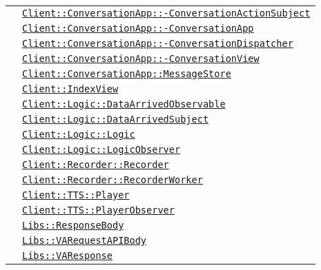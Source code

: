 \begin{longtable}{|>{\centering}m{3cm}|m{10cm}<{\centering}|}
& \hyperref[Client::ConversationApp::ConversationActionSubject]{\texttt{Client::ConversationApp::-\linebreak ConversationActionSubject}}\\
& \hyperref[Client::ConversationApp::ConversationApp]{\texttt{Client::ConversationApp::-\linebreak ConversationApp}}\\
& \hyperref[Client::ConversationApp::ConversationDispatcher]{\texttt{Client::ConversationApp::-\linebreak ConversationDispatcher}}\\
& \hyperref[Client::ConversationApp::ConversationView]{\texttt{Client::ConversationApp::-\linebreak ConversationView}}\\
& \hyperref[Client::ConversationApp::MessageStore]{\texttt{Client::ConversationApp::MessageStore}}\\
& \hyperref[Client::IndexView]{\texttt{Client::IndexView}}\\
& \hyperref[Client::Logic::DataArrivedObservable]{\texttt{Client::Logic::DataArrivedObservable}}\\
& \hyperref[Client::Logic::DataArrivedSubject]{\texttt{Client::Logic::DataArrivedSubject}}\\
& \hyperref[Client::Logic::Logic]{\texttt{Client::Logic::Logic}}\\
& \hyperref[Client::Logic::LogicObserver]{\texttt{Client::Logic::LogicObserver}}\\
& \hyperref[Client::Recorder::Recorder]{\texttt{Client::Recorder::Recorder}}\\
& \hyperref[Client::Recorder::RecorderWorker]{\texttt{Client::Recorder::RecorderWorker}}\\
& \hyperref[Client::TTS::Player]{\texttt{Client::TTS::Player}}\\
& \hyperref[Client::TTS::PlayerObserver]{\texttt{Client::TTS::PlayerObserver}}\\
& \hyperref[Libs::ResponseBody]{\texttt{Libs::ResponseBody}}\\
& \hyperref[Libs::VARequestAPIBody]{\texttt{Libs::VARequestAPIBody}}\\
& \hyperref[Libs::VAResponse]{\texttt{Libs::VAResponse}}\\ \hline


\end{longtable}
